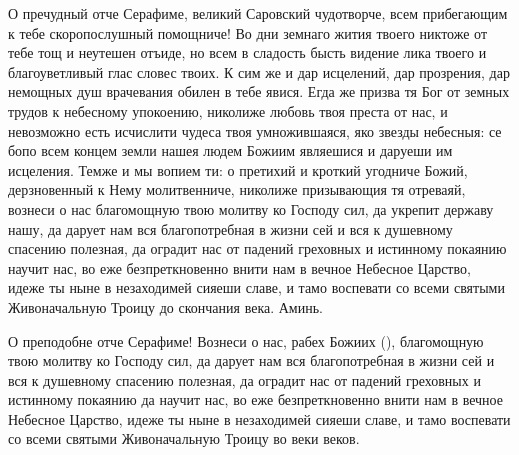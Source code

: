 \begin{mymulticols}
О пречудный отче Серафиме, великий Саровский чудотворче, всем прибегающим к тебе скоропослушный помощниче! Во дни земнаго жития твоего никтоже от тебе тощ и неутешен отъиде, но всем в сладость бысть видение лика твоего и благоуветливый глас словес твоих. К сим же и дар исцелений, дар прозрения, дар немощных душ врачевания обилен в тебе явися. Егда же призва тя Бог от земных трудов к небесному упокоению, николиже любовь твоя преста от нас, и невозможно есть исчислити чудеса твоя умножившаяся, яко звезды небесныя: се бопо всем концем земли нашея людем Божиим являешися и даруеши им исцеления. Темже и мы вопием ти: о претихий и кроткий угодниче Божий, дерзновенный к Нему молитвенниче, николиже призывающия тя отреваяй, вознеси о нас благомощную твою молитву ко Господу сил, да укрепит державу нашу, да дарует нам вся благопотребная в жизни сей и вся к душевному спасению полезная, да оградит нас от падений греховных и истинному покаянию научит нас, во еже безпреткновенно внити нам в вечное Небесное Царство, идеже ты ныне в незаходимей сияеши славе, и тамо воспевати со всеми святыми Живоначальную Троицу до скончания века. Аминь.




О преподобне отче Серафиме! Вознеси о нас, рабех Божиих (), благомощную твою молитву ко Господу сил, да дарует нам вся благопотребная в жизни сей и вся к душевному спасению полезная, да оградит нас от падений греховных и истинному покаянию да научит нас, во еже безпреткновенно внити нам в вечное Небесное Царство, идеже ты ныне в незаходимей сияеши славе, и тамо воспевати со всеми святыми Живоначальную Троицу во веки веков.

\end{mymulticols}

\mychapterending


